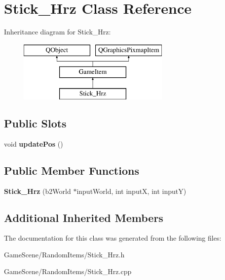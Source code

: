 \hypertarget{classStick__Hrz}{}\section{Stick\+\_\+\+Hrz Class Reference}
\label{classStick__Hrz}
Inheritance diagram for Stick\+\_\+\+Hrz\+:\begin{figure}[H]
\begin{center}
\leavevmode
\includegraphics[height=3.000000cm]{classStick__Hrz}
\end{center}
\end{figure}
\subsection*{Public Slots}
\begin{DoxyCompactItemize}
\item 
void {\bfseries update\+Pos} ()\hypertarget{classStick__Hrz_ab39bc022ebe97d3fcb3e6830d86c71b1}{}\label{classStick__Hrz_ab39bc022ebe97d3fcb3e6830d86c71b1}

\end{DoxyCompactItemize}
\subsection*{Public Member Functions}
\begin{DoxyCompactItemize}
\item 
{\bfseries Stick\+\_\+\+Hrz} (b2\+World $\ast$input\+World, int inputX, int inputY)\hypertarget{classStick__Hrz_a5d36244f2d76d587bcb1dd6e5406e9f2}{}\label{classStick__Hrz_a5d36244f2d76d587bcb1dd6e5406e9f2}

\end{DoxyCompactItemize}
\subsection*{Additional Inherited Members}


The documentation for this class was generated from the following files\+:\begin{DoxyCompactItemize}
\item 
Game\+Scene/\+Random\+Items/Stick\+\_\+\+Hrz.\+h\item 
Game\+Scene/\+Random\+Items/Stick\+\_\+\+Hrz.\+cpp\end{DoxyCompactItemize}
